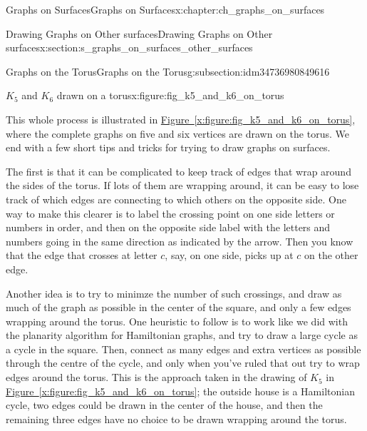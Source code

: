 \documentclass[oneside,10pt,]{book}
\newcommand{\xreffont}{\relax}
\numberwithin{equation}{section}
\begin{document}
\begin{chapterptx}{Graphs on Surfaces}{}{Graphs on Surfaces}{}{}{x:chapter:ch_graphs_on_surfaces}
\begin{sectionptx}{Drawing Graphs on Other surfaces}{}{Drawing Graphs on Other surfaces}{}{}{x:section:s_graphs_on_surfaces_other_surfaces}
\begin{subsectionptx}{Graphs on the Torus}{}{Graphs on the Torus}{}{}{g:subsection:idm34736980849616}
\begin{figureptx}{\(K_5\) and \(K_6\)  drawn on a torus}{x:figure:fig_k5_and_k6_on_torus}{}
\begin{image}{0}{1}{0}
{
}%
\end{image}%
\tcblower
\end{figureptx}%
This whole process is illustrated in \hyperref[x:figure:fig_k5_and_k6_on_torus]{Figure~{\xreffont\ref{x:figure:fig_k5_and_k6_on_torus}}}, where the complete graphs on five and six vertices are drawn on the torus.  We end with a few short tips and tricks for trying to draw graphs on surfaces.%
\par
The first is that it can be complicated to keep track of edges that wrap around the sides of the torus.  If lots of them are wrapping around, it can be easy to lose track of which edges are connecting to which others on the opposite side.  One way to make this clearer is to label the crossing point on one side letters or numbers in order, and then on the opposite side label with the letters and numbers going in the same direction as indicated by the arrow.  Then you know that the edge that crosses at letter \(c\), say, on one side, picks up at \(c\) on the other edge.%
\par
Another idea is to try to minimze the number of such crossings, and draw as much of the graph as possible in the center of the square, and only a few edges wrapping around the torus.  One heuristic to follow is to work like we did with the planarity algorithm for Hamiltonian graphs, and try to draw a large cycle as a cycle in the square.  Then, connect as many edges and extra vertices as possible through the centre of the cycle, and only when you've ruled that out try to wrap edges around the torus.  This is the approach taken in the drawing of \(K_5\) in \hyperref[x:figure:fig_k5_and_k6_on_torus]{Figure~{\xreffont\ref{x:figure:fig_k5_and_k6_on_torus}}}; the outside house is a Hamiltonian cycle, two edges could be drawn in the center of the house, and then the remaining three edges have no choice to be drawn wrapping around the torus.%
\par

\end{subsectionptx}
\end{sectionptx}
\end{chapterptx}
\end{document}
